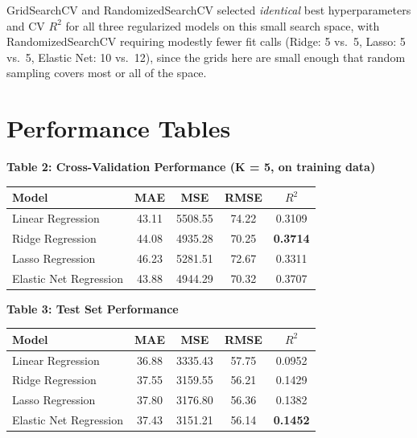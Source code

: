 \documentclass[12pt,a4paper]{article}
\newenvironment{fitwidth}
  {\begin{lrbox}{\fitbox}}
  {\end{lrbox}\ifdim\wd\fitbox>\linewidth\resizebox{\linewidth}{!}{\usebox{\fitbox}}\else\usebox{\fitbox}\fi}
\DeclareRobustCommand{\_}{\textunderscore\allowbreak}
\begin{document}
\vspace{0.2cm}
\noindent GridSearchCV and RandomizedSearchCV selected \emph{identical}
best hyperparameters and CV $R^2$ for all three regularized models on this
small search space, with RandomizedSearchCV requiring modestly fewer fit
calls (Ridge: 5 vs.\ 5, Lasso: 5 vs.\ 5, Elastic Net: 10 vs.\ 12), since the
grids here are small enough that random sampling covers most or all of the
space.

\section{Performance Tables}

\begin{center}
\begin{minipage}{\linewidth}\centering
\textbf{Table 2: Cross-Validation Performance (K = 5, on training data)}\par\smallskip
\begin{fitwidth}
\begin{tabular}{lcccc}
\toprule
Model & MAE & MSE & RMSE & $R^2$ \\
\midrule
Linear Regression        & 43.11 & 5508.55 & 74.22 & 0.3109 \\
Ridge Regression         & 44.08 & 4935.28 & 70.25 & \textbf{0.3714} \\
Lasso Regression         & 46.23 & 5281.51 & 72.67 & 0.3311 \\
Elastic Net Regression   & 43.88 & 4944.29 & 70.32 & 0.3707 \\
\bottomrule
\end{tabular}
\end{fitwidth}
\end{minipage}
\end{center}

\vspace{0.3cm}
\begin{center}
\begin{minipage}{\linewidth}\centering
\textbf{Table 3: Test Set Performance}\par\smallskip
\begin{fitwidth}
\begin{tabular}{lcccc}
\toprule
Model & MAE & MSE & RMSE & $R^2$ \\
\midrule
Linear Regression       & 36.88 & 3335.43 & 57.75 & 0.0952 \\
Ridge Regression        & 37.55 & 3159.55 & 56.21 & 0.1429 \\
Lasso Regression        & 37.80 & 3176.80 & 56.36 & 0.1382 \\
Elastic Net Regression  & 37.43 & 3151.21 & 56.14 & \textbf{0.1452} \\
\bottomrule
\end{tabular}
\end{fitwidth}
\end{minipage}
\end{center}
\end{document}
